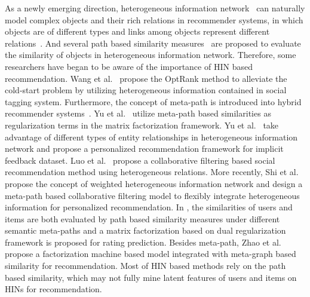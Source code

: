 As a newly emerging direction, heterogeneous information network~\cite{shi2017survey} can naturally model complex objects and their rich relations in recommender systems, in which objects are of different types and links among objects represent different relations~\cite{sun2013mining,ou2013comparing}. And several path based similarity measures~\cite{lao2010relational,sun2011pathsim,shi2014hetesim} are proposed to evaluate the similarity of objects in heterogeneous information network. Therefore, some researchers have began to be aware of the importance of HIN based recommendation. Wang et al.~\cite{feng2012incorporating} propose the OptRank method to alleviate the cold-start problem by utilizing heterogeneous information contained in social tagging system. Furthermore, the concept of meta-path is introduced into hybrid recommender systems~\cite{yu2013recommendation}. Yu et al.~\cite{yu2013collaborative} utilize meta-path based similarities as regularization terms in the matrix factorization framework. Yu et al.~\cite{yu2014personalized} take advantage of different types of entity relationships in heterogeneous information network and propose a personalized recommendation framework for implicit feedback dataset. Luo et al.~\cite{luo2014hete} propose a collaborative filtering based social recommendation method using heterogeneous relations. More recently, Shi et al.~\cite{shi2015semantic} propose the concept of weighted heterogeneous information network and design a meta-path based collaborative filtering model to flexibly integrate heterogeneous information for personalized recommendation. In \cite{shi2016integrating,zheng2016dual,zheng2017recommendation}, the similarities of users and items are both evaluated by path based similarity measures under different semantic meta-paths and a matrix factorization based on dual regularization framework is proposed for rating prediction. Besides meta-path, Zhao et al.~\cite{zhao2017meta} propose a factorization machine based model integrated with meta-graph based similarity for recommendation. Most of HIN based methods rely on the path based similarity, which may not fully mine latent features of users and items on HINs for recommendation.



